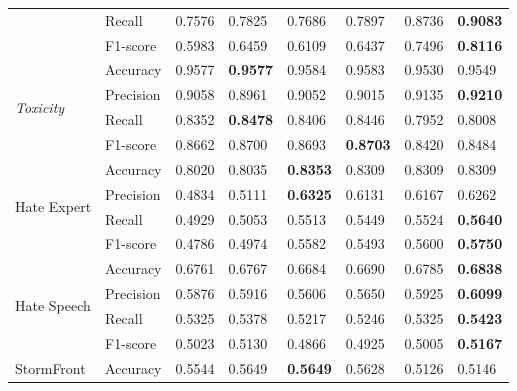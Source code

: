 \begin{table}[]
\begin{minipage}{0.42\paperheight}
{\begin{tabular}{ll|ll|ll|ll}
                                        & Recall    & 0.7576 & 0.7825            & 0.7686      & 0.7897      & 0.8736 & \bf{0.9083}     \\
                                        & F1-score  & 0.5983 & 0.6459            & 0.6109      & 0.6437      & 0.7496 & \bf{0.8116}     \\ \hline
    \multirow{4}{*}{\it{Toxicity}}      & Accuracy  & 0.9577 & \bf{0.9577}       & 0.9584      & 0.9583      & 0.9530 & 0.9549          \\
                                        & Precision & 0.9058 & 0.8961            & 0.9052      & 0.9015      & 0.9135 & \bf{0.9210}     \\
                                        & Recall    & 0.8352 & \bf{0.8478}       & 0.8406      & 0.8446      & 0.7952 & 0.8008          \\
                                        & F1-score  & 0.8662 & 0.8700            & 0.8693      & \bf{0.8703} & 0.8420 & 0.8484          \\ \hline
    \multirow{4}{*}{Hate Expert}        & Accuracy  & 0.8020 & 0.8035            & \bf{0.8353} & 0.8309      & 0.8309 & 0.8309          \\
                                        & Precision & 0.4834 & 0.5111            & \bf{0.6325} & 0.6131      & 0.6167 & 0.6262          \\
                                        & Recall    & 0.4929 & 0.5053            & 0.5513      & 0.5449      & 0.5524 & \bf{0.5640}     \\
                                        & F1-score  & 0.4786 & 0.4974            & 0.5582      & 0.5493      & 0.5600 & \bf{0.5750}     \\ \hline
    \multirow{4}{*}{Hate Speech}        & Accuracy  & 0.6761 & 0.6767            & 0.6684      & 0.6690      & 0.6785 & \bf{0.6838}     \\
                                        & Precision & 0.5876 & 0.5916            & 0.5606      & 0.5650      & 0.5925 & \bf{0.6099}     \\
                                        & Recall    & 0.5325 & 0.5378            & 0.5217      & 0.5246      & 0.5325 & \bf{0.5423}     \\
                                        & F1-score  & 0.5023 & 0.5130            & 0.4866      & 0.4925      & 0.5005 & \bf{0.5167}     \\ \hline
    \multirow{4}{*}{StormFront}         & Accuracy  & 0.5544 & 0.5649            & \bf{0.5649} & 0.5628      & 0.5126 & 0.5146          \\

\end{tabular}}
\end{minipage}
\end{table}
